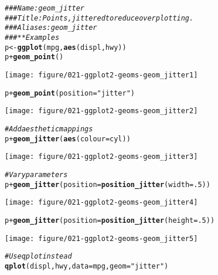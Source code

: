 \documentclass[a4paper,titlepage]{tufte-handout}\usepackage[]{graphicx}\usepackage[]{color}
\makeatletter
\def\maxwidth{ %
  \ifdim\Gin@nat@width>\linewidth
    \linewidth
  \else
    \Gin@nat@width
  \fi
}
\newcommand{\hlnum}[1]{\textcolor[rgb]{0.686,0.059,0.569}{#1}}%
\newcommand{\hlstr}[1]{\textcolor[rgb]{0.192,0.494,0.8}{#1}}%
\newcommand{\hlcom}[1]{\textcolor[rgb]{0.678,0.584,0.686}{\textit{#1}}}%
\newcommand{\hlopt}[1]{\textcolor[rgb]{0,0,0}{#1}}%
\newcommand{\hlstd}[1]{\textcolor[rgb]{0.345,0.345,0.345}{#1}}%
\newcommand{\hlkwb}[1]{\textcolor[rgb]{0.69,0.353,0.396}{#1}}%
\newcommand{\hlkwc}[1]{\textcolor[rgb]{0.333,0.667,0.333}{#1}}%
\newcommand{\hlkwd}[1]{\textcolor[rgb]{0.737,0.353,0.396}{\textbf{#1}}}%
\newenvironment{kframe}{%
 \def\at@end@of@kframe{}%
 \ifinner\ifhmode%
  \def\at@end@of@kframe{\end{minipage}}%
  \begin{minipage}{\columnwidth}%
 \fi\fi%
 \def\FrameCommand##1{\hskip\@totalleftmargin \hskip-\fboxsep
 \colorbox{shadecolor}{##1}\hskip-\fboxsep
     \hskip-\linewidth \hskip-\@totalleftmargin \hskip\columnwidth}%
 \MakeFramed {\advance\hsize-\width
   \@totalleftmargin\z@ \linewidth\hsize
   \@setminipage}}%
 {\par\unskip\endMakeFramed%
 \at@end@of@kframe}
\newenvironment{knitrout}{}{} %
\makeatother
\begin{document}
\begin{knitrout}
\color{fgcolor}\begin{kframe}
\begin{alltt}
\hlcom{### Name: geom_jitter}
\hlcom{### Title: Points, jittered to reduce overplotting.}
\hlcom{### Aliases: geom_jitter}
\hlcom{### ** Examples}
\hlstd{p} \hlkwb{<-} \hlkwd{ggplot}\hlstd{(mpg,} \hlkwd{aes}\hlstd{(displ, hwy))}
\hlstd{p} \hlopt{+} \hlkwd{geom_point}\hlstd{()}
\end{alltt}
\end{kframe}
\texttt{[image: figure/021-ggplot2-geoms-geom\_jitter1]} 
\begin{kframe}\begin{alltt}
\hlstd{p} \hlopt{+} \hlkwd{geom_point}\hlstd{(}\hlkwc{position} \hlstd{=} \hlstr{"jitter"}\hlstd{)}
\end{alltt}
\end{kframe}
\texttt{[image: figure/021-ggplot2-geoms-geom\_jitter2]} 
\begin{kframe}\begin{alltt}
\hlcom{# Add aesthetic mappings}
\hlstd{p} \hlopt{+} \hlkwd{geom_jitter}\hlstd{(}\hlkwd{aes}\hlstd{(}\hlkwc{colour} \hlstd{= cyl))}
\end{alltt}
\end{kframe}
\texttt{[image: figure/021-ggplot2-geoms-geom\_jitter3]} 
\begin{kframe}\begin{alltt}
\hlcom{# Vary parameters}
\hlstd{p} \hlopt{+} \hlkwd{geom_jitter}\hlstd{(}\hlkwc{position} \hlstd{=} \hlkwd{position_jitter}\hlstd{(}\hlkwc{width} \hlstd{=} \hlnum{.5}\hlstd{))}
\end{alltt}
\end{kframe}
\texttt{[image: figure/021-ggplot2-geoms-geom\_jitter4]} 
\begin{kframe}\begin{alltt}
\hlstd{p} \hlopt{+} \hlkwd{geom_jitter}\hlstd{(}\hlkwc{position} \hlstd{=} \hlkwd{position_jitter}\hlstd{(}\hlkwc{height} \hlstd{=} \hlnum{.5}\hlstd{))}
\end{alltt}
\end{kframe}
\texttt{[image: figure/021-ggplot2-geoms-geom\_jitter5]} 
\begin{kframe}\begin{alltt}
\hlcom{# Use qplot instead}
\hlkwd{qplot}\hlstd{(displ, hwy,} \hlkwc{data} \hlstd{= mpg,} \hlkwc{geom} \hlstd{=} \hlstr{"jitter"}\hlstd{)}

\end{alltt}
\end{kframe}
\end{knitrout}
\end{document}
